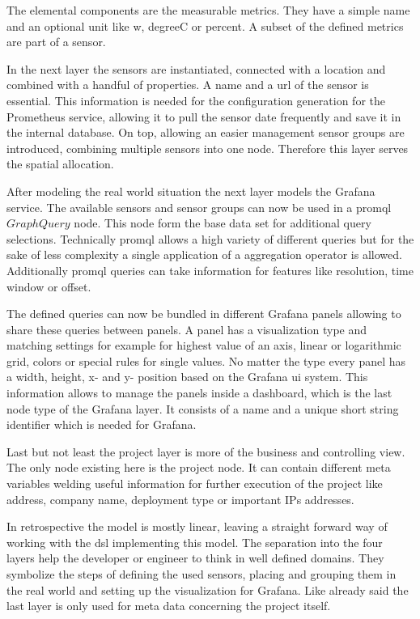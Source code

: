 The elemental components are the measurable metrics. They have a simple name and an optional unit like \gls{w}, \gls{degreeC} or \gls{percent}. A subset of the defined metrics are part of a sensor.

In the next layer the sensors are instantiated, connected with a location and combined with a handful of properties. A name and a \gls{url} of the sensor is essential. This information is needed for the configuration generation for the Prometheus service, allowing it to pull the sensor date frequently and save it in the internal database. On top, allowing an easier management sensor groups are introduced, combining multiple sensors into one node. Therefore this layer serves the spatial allocation. 

After modeling the real world situation the next layer models the Grafana service. The available sensors and sensor groups can now be used in a \gls{promql} $GraphQuery$ node. This node form the base data set for additional query selections. Technically \gls{promql} allows a high variety of different queries but for the sake of less complexity a single application of a aggregation operator is allowed. Additionally \gls{promql} queries can take information for features like resolution, time window or offset. 

The defined queries can now be bundled in different Grafana panels allowing to share these queries between panels. A panel has a visualization type and matching settings for example for highest value of an axis, linear or logarithmic grid, colors or special rules for single values. No matter the type every panel has a width, height, x- and y- position based on the Grafana \gls{ui} system. This information allows to manage the panels inside a dashboard, which is the last node type of the Grafana layer. It consists of a name and a unique short string identifier which is needed for Grafana. 

Last but not least the project layer is more of the business and controlling view. The only node existing here is the project node. It can contain different meta variables welding useful information for further execution of the project like address, company name, deployment type or important \glspl{IP} addresses. 

In retrospective the model is mostly linear, leaving a straight forward way of working with the \gls{dsl} implementing this model. The separation into the four layers help the developer or engineer to think in well defined domains. They symbolize the steps of defining the used sensors, placing and grouping them in the real world and setting up the visualization for Grafana. Like already said the last layer is only used for meta data concerning the project itself.


